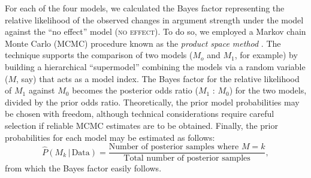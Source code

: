 \documentclass[doc,12pt]{apa}
\newcommand{\given}{\, | \, } %
\begin{document}
For each of the four models, we calculated the Bayes factor representing the relative likelihood of the observed changes in argument strength under the model against the ``no effect'' model (\textsc{no effect}). To do so, we employed a Markov chain Monte Carlo (MCMC) procedure known as the {\em product space method} \cite{LKLT11}. The technique supports the comparison of two models ($M_o$ and $M_1$, for example) by building a hierarchical ``supermodel'' combining the models via a random variable ($M$, say) that acts as a model index. The Bayes factor for the relative likelihood of $M_1$ against $M_0$ becomes the posterior odds ratio ($M_1$ : $M_0$) for the two models, divided by the prior odds ratio. Theoretically, the prior model probabilities may be chosen with freedom, although technical considerations require careful selection if reliable MCMC estimates are to be obtained. Finally, the prior probabilities for each model may be estimated as follows:
\begin{equation}
\label{eqn:modelposterior}
\hat{P}(M_k \given \textrm{Data}) = \frac{\textrm{Number of posterior samples where $M = k$}}{\textrm{Total number of posterior samples}},
\end{equation}
from which the Bayes factor easily follows.
\end{document}
